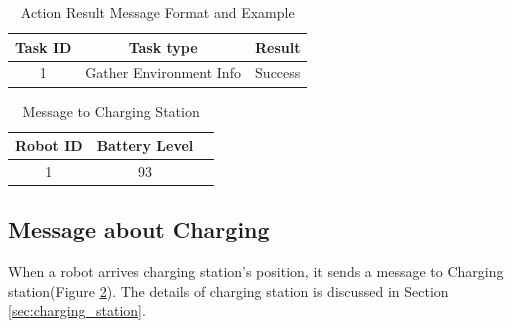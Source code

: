 \begin{table}[htb]
\centering
\begin{tabular}{|c|c|c|} 
\hline
Task ID 	& Task type	& Result\\
\hline\hline
1 & Gather Environment Info & Success \\ [1ex] 
\hline
\end{tabular}
\caption{Action Result Message Format and Example}
\label{tab:result_message}
\end{table}


\begin{table}[htb]
\centering
\begin{tabular}{|c|c|c|} 
\hline
Robot ID & Battery Level \\
\hline\hline
1 & 93 \\ [1ex] 
\hline
\end{tabular}
\caption{Message to Charging Station}
\label{tab:message_to_charging_staion}
\end{table}

\subsection{Message about Charging}
  
When a robot arrives charging station's position, it sends a message to Charging station(Figure \ref{tab:message_to_charging_staion}). The details of charging station is discussed in Section \ref{sec:charging_station}. 

